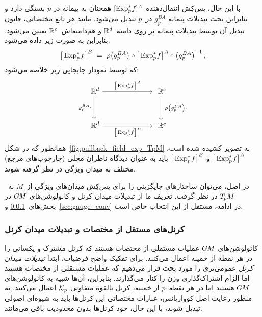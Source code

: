 با این حال، پس‌کِش انتقال‌دهنده $[\operatorname{Exp}^*_p\mkern-2mu f]^A$ همچنان به پیمانه در $p$ بستگی دارد و بنابراین تحت تبدیلات پیمانه $g_p^{BA}$ در~$p$ تبدیل می‌شود.
مانند هر تابع مختصاتی، قانون تبدیل آن توسط تبدیلات پیمانه بر روی دامنه~$\mathbb{R}^d$ و هم‌دامنه‌اش~$\mathbb{R}^c$ تعیین می‌شود.
بنابراین به صورت زیر داده می‌شود:
\begin{align}\label{eq:trafo_law_transporter_pullback}
	\big[ \operatorname{Exp}^*_p\mkern-2mu f \big]^B\ =\ \rho\big( g_p^{BA} \big) \circ \big[ \operatorname{Exp}^*_p\mkern-2mu f \big]^A \circ \big(g_p^{BA} \big)^{-1} \,,
\end{align}
که توسط نمودار جابجایی زیر خلاصه می‌شود:
\begin{equation}\label{cd:}
	\begin{tikzcd}[column sep=70pt, row sep=32pt, font=\normalsize]
		\R^d
		\arrow[d, "g_p^{BA} \cdot\,"']
		\arrow[r, "{\big[\mkern-1mu \Expspf \big]^A}"]
		&
		\R^c
		\arrow[d, "\ \rho\big(g_p^{BA}\big) \cdot"]
		\\
		\R^d
		\arrow[r, "{\big[\mkern-1mu \Expspf \big]^B}"']
		&
		\R^c
	\end{tikzcd}
\end{equation}
همانطور که در شکل~\ref{fig:pullback_field_exp_TpM} به تصویر کشیده شده است، $\big[\operatorname{Exp}^*_p\mkern-2mu f\big]^A$ و $\big[\operatorname{Exp}^*_p\mkern-2mu f\big]^B$ باید به عنوان دیدگاه ناظران محلی (چارچوب‌های مرجع) مختلف به میدان ویژگی در نظر گرفته شوند.


در اصل، می‌توان ساختارهای جایگزینی را برای پس‌کِش میدان‌های ویژگی از~$M$ به~$T_{\mkern-1.5mu p}\mkern-.5muM$ در نظر گرفت.
تعریف ما از تبدیلات میدان کرنل و کانولوشن‌های $G\mkern-1.4muM$ در بخش‌های~\ref{sec:kernel_field_trafos} و~\ref{sec:gauge_conv} در ادامه، مستقل از این انتخاب خاص است.








\subsubsection{کرنل‌های مستقل از مختصات و تبدیلات میدان کرنل}
\label{sec:kernel_field_trafos}

کانولوشن‌های $G\mkern-1.4muM$ عملیات مستقلی از مختصات هستند که کرنل مشترک و یکسانی را در هر نقطه از خمینه اعمال می‌کنند.
برای تفکیک واضح فرضیات، ابتدا \emph{تبدیلات میدان کرنل} عمومی‌تری را مورد بحث قرار می‌دهیم که عملیات مستقلی از مختصات هستند اما الزام اشتراک‌گذاری وزن را کنار می‌گذارند.
بنابراین، آن‌ها شبیه به کانولوشن‌های $G\mkern-1.4muM$ هستند اما در هر نقطه~$p$ از خمینه، کرنل بالقوه متفاوتی $\mathcal{K}_p$ اعمال می‌کنند.
به منظور رعایت اصل کوواریانس، عبارات مختصاتی این کرنل‌ها باید به شیوه‌ای اصولی تبدیل شوند، با این حال، خود کرنل‌ها بدون محدودیت باقی می‌مانند.


